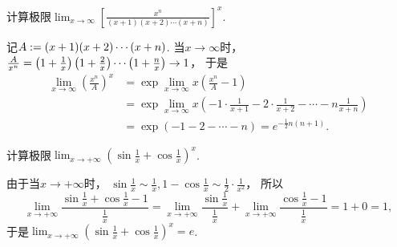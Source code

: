 \begin{example}
计算极限\(\lim_{x\to\infty} \left[ \frac{x^n}{(x+1)(x+2)\dotsm(x+n)} \right]^x\).
\begin{solution}
记\(A := (x+1)(x+2)\dotsm(x+n)\).
当\(x\to\infty\)时，\(\frac{A}{x^n}
= \left( 1+\frac1x \right) \left( 1+\frac2x \right) \dotsm \left( 1+\frac{n}{x} \vphantom{\frac1x} \right)
\to 1\)，
于是\begin{align*}
	\lim_{x\to\infty} \left( \frac{x^n}{A} \right)^x
	&= \exp\lim_{x\to\infty} x \left( \frac{x^n}{A} - 1 \right) \\
	&= \exp\lim_{x\to\infty} x \left( -1 \cdot \frac1{x+1} - 2 \cdot \frac1{x+2} - \dotsb - n \frac1{x+n} \right) \\
	&= \exp\left( -1-2-\dotsb-n \right)
	= e^{-\frac12 n(n+1)}.
\end{align*}
\end{solution}
\end{example}
\begin{example}
计算极限\(\lim_{x\to+\infty} \left( \sin\frac1x + \cos\frac1x \right)^x\).
\begin{solution}
由于当\(x\to+\infty\)时，
\(\sin\frac1x \sim \frac1x,
1-\cos\frac1x \sim \frac12 \cdot \frac1{x^2}\)，
所以\begin{equation*}
	\lim_{x\to+\infty} \frac{\sin\frac1x + \cos\frac1x - 1}{\frac1x}
	= \lim_{x\to+\infty} \frac{\sin\frac1x}{\frac1x}
	+ \lim_{x\to+\infty} \frac{\cos\frac1x - 1}{\frac1x}
	= 1 + 0
	= 1,
\end{equation*}
于是\(\lim_{x\to+\infty} \left( \sin\frac1x + \cos\frac1x \right)^x
= e\).
\end{solution}
\end{example}

